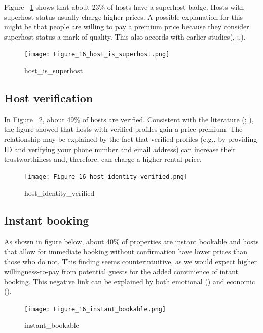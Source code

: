 Figure ~\ref{fig:host_is_superhost} shows that about 23\% of hosts have a
superhost badge. Hosts with superhost status usually charge higher prices. A
possible explanation for this might be that people are willing to pay a premium
price because they consider superhost status a mark of quality.  This also
accords with earlier studies(\cite{gibbs2018use},
\cite{kakar2016effects};\cite{wang2017price},\cite{cai2019price}).

\begin{figure}[H]\centering
    \texttt{[image: Figure\_16\_host\_is\_superhost.png]}
    \caption{host\_is\_superhost}
    \label{fig:host_is_superhost}
\end{figure}

\subsection{Host verification}
In Figure ~\ref{fig:host_identity_verified}, about 49\% of hosts are verified.
Consistent with the literature (\cite{chen2017consumer}; \cite{wang2017price}),
the figure showed that hosts with verified profiles gain a price premium. The
relationship may be explained by the fact that verified profiles (e.g., by
providing ID and verifying your phone number and email address)  can increase
their trustworthiness and, therefore, can charge a higher rental price.

\begin{figure}[H]
    \centering
    \texttt{[image: Figure\_16\_host\_identity\_verified.png]}
    \caption{host\_identity\_verified}
    \label{fig:host_identity_verified}
\end{figure}

\subsection{Instant booking}

As shown in figure below, about 40\% of properties are instant bookable and
hosts that allow for immediate booking without confirmation  have lower prices
than those who do not. This finding seems counterintuitive, as we would expect
higher willingness-to-pay from potential guests for the added convinience of
intant booking.  This negative link can be explained by both emotional
(\textcite{wang2017price}) and economic (\textcite{benitez2018flexible}).

\begin{figure}[H]
    \centering
    \texttt{[image: Figure\_16\_instant\_bookable.png]}
    \caption{instant\_bookable}
    \label{fig:instant_bookable}
\end{figure}

